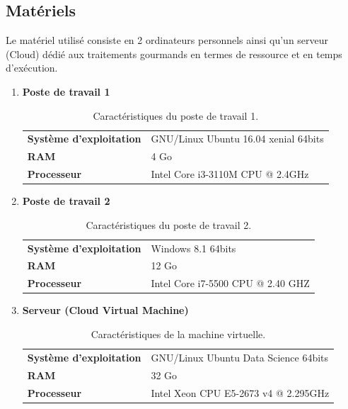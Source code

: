 \subsection{Matériels}
Le matériel utilisé consiste en 2 ordinateurs personnels ainsi qu'un serveur (Cloud) dédié aux traitements gourmands en termes de ressource et en temps d'exécution.
\begin{enumerate}
    \item{\textbf{Poste de travail 1}}
    \begin{table}[h!]
        \begin{center}
            \begin{tabular}{|C{5cm}|C{8cm}|}
                \hline
                \textbf{Système d'exploitation} &  GNU/Linux Ubuntu 16.04 xenial 64bits \\
                \textbf{RAM} &  4 Go \\
                \textbf{Processeur} & Intel Core i3-3110M CPU @ 2.4GHz \\
                \hline
            \end{tabular}
        \end{center}
        \caption{Caractéristiques du poste de travail 1.}
    \end{table}
    
    \item{\textbf{Poste de travail 2}}
    \begin{table}[h!]
        \begin{center}
            \begin{tabular}{|C{5cm}|C{8cm}|}
                \hline
                \textbf{Système d'exploitation} &  Windows 8.1 64bits \\
                \textbf{RAM} &  12 Go \\
                \textbf{Processeur} & Intel Core i7-5500 CPU @ 2.40 GHZ \\
                \hline
            \end{tabular}
        \end{center}
        \caption{Caractéristiques du poste de travail 2.}
    \end{table}
    
    \item{\textbf{Serveur (Cloud Virtual Machine)}}
    \begin{table}[h!]
        \begin{center}
            \begin{tabular}{|C{5cm}|C{8cm}|}
                \hline
                \textbf{Système d'exploitation} &  GNU/Linux Ubuntu Data Science 64bits \\
                \textbf{RAM} &  32 Go \\
                \textbf{Processeur} & Intel Xeon CPU E5-2673 v4 @ 2.295GHz \\
                \hline
            \end{tabular}
        \end{center}
        \caption{Caractéristiques de la machine virtuelle.}
    \end{table}
\end{enumerate}   

